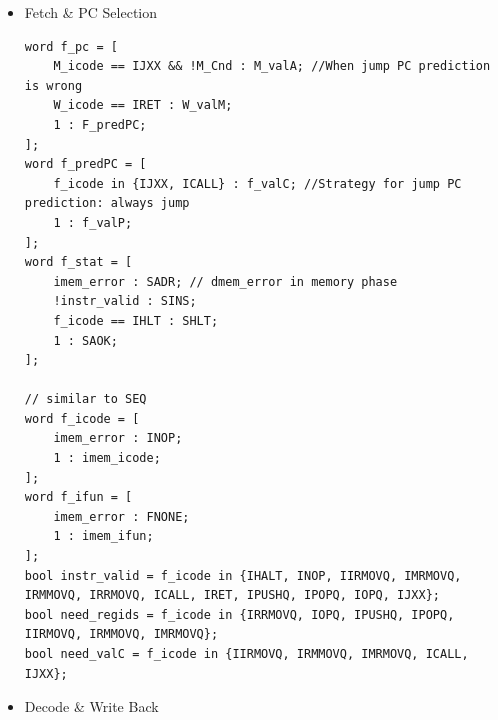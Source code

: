 \begin{itemize}
\item Fetch \& PC Selection
\begin{lstlisting}
word f_pc = [
	M_icode == IJXX && !M_Cnd : M_valA; //When jump PC prediction is wrong
	W_icode == IRET : W_valM;
	1 : F_predPC;
];
word f_predPC = [
	f_icode in {IJXX, ICALL} : f_valC; //Strategy for jump PC prediction: always jump
	1 : f_valP;
];
word f_stat = [
	imem_error : SADR; // dmem_error in memory phase
	!instr_valid : SINS;
	f_icode == IHLT : SHLT;
	1 : SAOK;
];

// similar to SEQ
word f_icode = [
	imem_error : INOP;
	1 : imem_icode;
];
word f_ifun = [
	imem_error : FNONE;
	1 : imem_ifun;
];
bool instr_valid = f_icode in {IHALT, INOP, IIRMOVQ, IMRMOVQ, IRMMOVQ, IRRMOVQ, ICALL, IRET, IPUSHQ, IPOPQ, IOPQ, IJXX};
bool need_regids = f_icode in {IRRMOVQ, IOPQ, IPUSHQ, IPOPQ, IIRMOVQ, IRMMOVQ, IMRMOVQ};
bool need_valC = f_icode in {IIRMOVQ, IRMMOVQ, IMRMOVQ, ICALL, IJXX};
\end{lstlisting}
\item Decode \& Write Back


\end{itemize}
